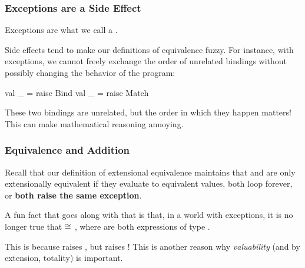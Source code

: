\documentclass[aspectratio=169]{beamer}
\begin{document}
\begin{frame}[fragile]
  \frametitle{Exceptions are a Side Effect}

  Exceptions are what we call a .

  \pause
  \vspace{\fill}


  \pause
  \vspace{\fill}

  Side effects tend to make our definitions of equivalence fuzzy. For instance,
  with exceptions, we cannot freely exchange the order of unrelated
   bindings without possibly changing the behavior of the program:
  \begin{codeblock}
    val _ = raise Bind
    val _ = raise Match
  \end{codeblock}
  These two bindings are unrelated, but the order in which they happen
  matters! This can make mathematical reasoning annoying.
\end{frame}

\begin{frame}[fragile]
  \frametitle{Equivalence and Addition}

  \ptsnmtmt

  Recall that our definition of extensional equivalence maintains that 
  and  are only extensionally equivalent if they evaluate to equivalent
  values, both loop forever, or \textbf{both raise the same exception}.

  \pause
  \vspace{\fill}

  A fun fact that goes along with that is that, in a world with exceptions, it is
  no longer true that  $\cong$ , where  are
  both expressions of type .

  \pause
  \vspace{\fill}

  This is because  raises , but
   raises ! This is another reason
  why \textit{valuability} (and by extension, totality) is important.
\end{frame}
\end{document}
